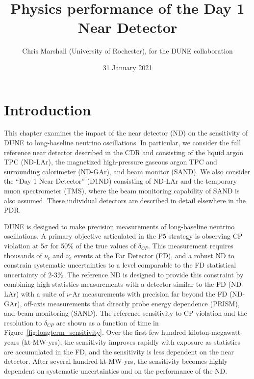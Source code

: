 \documentclass[11pt]{article}
\title{Physics performance of the Day 1 Near Detector}
\author{Chris Marshall (University of Rochester), for the DUNE collaboration}
\date{31 January 2021}
\begin{document}
\maketitle

\section{Introduction}
\label{sec:intro}

This chapter examines the impact of the near detector (ND) on the sensitivity of DUNE to long-baseline neutrino oscillations. In particular, we consider the full reference near detector described in the CDR and consisting of the liquid argon TPC (ND-LAr), the magnetized high-pressure gaseous argon TPC and surrounding calorimeter (ND-GAr), and beam monitor (SAND). We also consider the ``Day 1 Near Detector'' (D1ND) consisting of ND-LAr and the temporary muon spectrometer (TMS), where the beam monitoring capability of SAND is also assumed. These individual detectors are described in detail elsewhere in the PDR.

DUNE is designed to make precision measurements of long-baseline neutrino oscillations. A primary objective articulated in the P5 strategy is observing CP violation at 5$\sigma$ for 50\% of the true values of $\delta_{CP}$. This measurement requires thousands of $\nu_{e}$ and $\bar{\nu}_{e}$ events at the Far Detector (FD), and a robust ND to constrain systematic uncertainties to a level comparable to the FD statistical uncertainty of 2-3\%. The reference ND is designed to provide this constraint by combining high-statistics measurements with a detector similar to the FD (ND-LAr) with a suite of $\nu$-Ar measurements with precision far beyond the FD (ND-GAr), off-axis measurements that directly probe energy dependence (PRISM), and beam monitoring (SAND). The reference sensitivity to CP-violation and the resolution to $\delta_{CP}$ are shown as a function of time in Figure~\ref{fig:longterm_sensitivity}. Over the first few hundred kiloton-megawatt-years (kt-MW-yrs), the sensitivity improves rapidly with exposure as statistics are accumulated in the FD, and the sensitivity is less dependent on the near detector. After several hundred kt-MW-yrs, the sensitivity becomes highly dependent on systematic uncertainties and on the performance of the ND.
\end{document}
